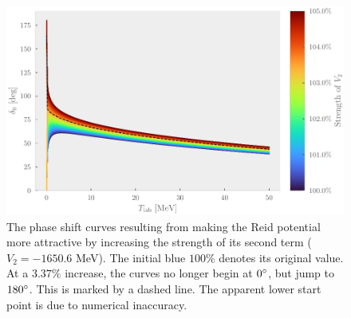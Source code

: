 \begin{figure}[ht!]
  \centering
  \includegraphics[]{Figures/change_in_V2.pdf}
  \caption{\label{fig:changeV2}The phase shift curves resulting from making the
  Reid potential more attractive by increasing the strength of its second term
  (\(V_{2}=-1650.6\) MeV). The initial blue \(100\%\) denotes its original
  value. At a \(3.37\%\) increase, the curves no longer begin at \(0\degree\),
  but jump to \(180\degree\). This is marked by a dashed line. The apparent lower start point is due to numerical
inaccuracy.}
\end{figure}



